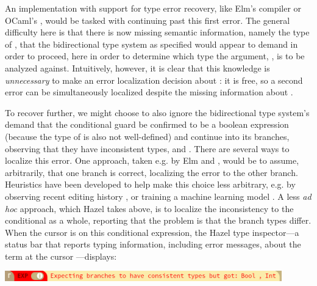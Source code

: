 An implementation with support for type error recovery, like Elm's compiler or OCaml's  \cite{bour2018merlin}, would 
 be tasked with continuing past this first error.
 The general difficulty here is that there is now missing semantic information, namely the type of , that 
 the bidirectional type system as specified 
 would appear to demand in order to proceed, here in order to determine which type the argument, , is to be analyzed against. 
 Intuitively, however, it is clear that this knowledge is \emph{unnecessary} to make an error localization decision about : 
it is free, so a second error can be simultaneously localized despite the missing information about . 

To recover further, we might choose to also ignore the bidirectional type system's demand that the conditional guard be confirmed to be a boolean expression 
(because the type of  is also not well-defined) 
and continue into its branches, observing that they have inconsistent types,  and . 
There are several ways to localize this error. 
One approach, taken e.g. by Elm and , would be to assume, arbitrarily, that one branch is correct, localizing the error to the other branch. 
Heuristics have been developed to help make this choice less arbitrary, e.g. 
by observing recent editing history \cite{steady-typing}, 
or training a machine learning model \cite{SeidelBlame}. 
A less \emph{ad hoc} approach, which Hazel takes above, is to localize the inconsistency to the conditional as a whole, reporting that the problem is that the branch types differ. When the cursor is on this conditional expression, the Hazel type inspector---a status bar that reports typing information, including error messages, about the term at the cursor \cite{potter2020hazel}---displays:

\begin{center}
  \includegraphics[width=0.9\textwidth]{images/haz3l-inconsistent-branches-cursor-inspector.png}
\end{center}


